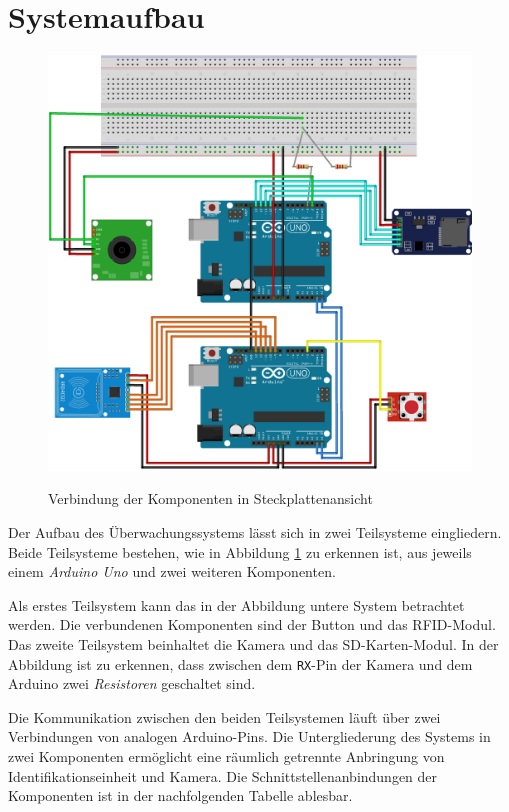 \documentclass[a4paper, 11pt]{article}
\begin{document}
\section{Systemaufbau}
\begin{figure}[htb]
\centering
    {\includegraphics[width=1\textwidth]{uebersicht.png}}
    \caption{Verbindung der Komponenten in Steckplattenansicht\label{fig:uebersicht}}
\centering
\end{figure}

\noindent Der Aufbau des Überwachungssystems lässt sich in zwei Teilsysteme eingliedern. Beide Teilsysteme bestehen, wie in Abbildung \ref{fig:uebersicht} zu erkennen ist, aus jeweils einem \textit{Arduino Uno} und zwei weiteren Komponenten. 

Als erstes Teilsystem kann das in der Abbildung untere System betrachtet werden. Die verbundenen Komponenten sind der Button und das RFID-Modul.
Das zweite Teilsystem beinhaltet die Kamera und das SD-Karten-Modul. In der Abbildung ist zu erkennen, dass zwischen dem \texttt{RX}-Pin der Kamera und dem Arduino zwei \textit{Resistoren} geschaltet sind.

Die Kommunikation zwischen den beiden Teilsystemen läuft über zwei Verbindungen von analogen Arduino-Pins. Die Untergliederung des Systems in zwei Komponenten ermöglicht eine räumlich getrennte Anbringung von Identifikationseinheit und Kamera. Die Schnittstellenanbindungen der Komponenten ist in der nachfolgenden Tabelle ablesbar.
\end{document}
